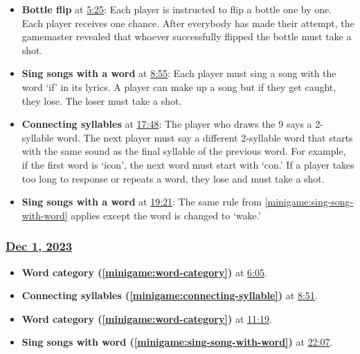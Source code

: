 \documentclass{article}
\begin{document}
\begin{itemize}
    \item \textbf{Bottle flip} at \href{https://youtu.be/S_QeMzgNCyg?t=325}{5:25}: Each player is instructed to flip a bottle one by one. Each player receives one chance. After everybody has made their attempt, the gamemaster revealed that whoever successfully flipped the bottle must take a shot. \label{minigame:bottle-flip}
    \item \textbf{Sing songs with a word} at \href {https://youtu.be/S_QeMzgNCyg?t=534}{8:55}: Each player must sing a song with the word `if' in its lyrics. A player can make up a song but if they get caught, they lose. The loser must take a shot.\label{minigame:sing-song-with-word}
    \item  \textbf{Connecting syllables} at \href{https://youtu.be/S_QeMzgNCyg?t=1068}{17:48}: The player who draws the 9 says a 2-syllable word. The next player must say a different 2-syllable word that starts with the same sound as the final syllable of the previous word. For example, if the first word is `icon', the next word must start with `con.' If a player takes too long to response or repeats a word, they lose and must take a shot.\label{minigame:connecting-syllable}
    \item \textbf{Sing songs with a word} at \href{https://youtu.be/S_QeMzgNCyg?t=1161}{19:21}: The same rule from \ref{minigame:sing-song-with-word} applies except the word is changed to `wake.'
\end{itemize}

\subsubsection{\href{https://youtu.be/S_QeMzgNCyg}{Dec 1, 2023}}

\begin{itemize}
    \item \textbf{Word category (\ref{minigame:word-category})} at \href{https://youtu.be/qGlxgQeKXUg?t=365}{6:05}.
    \item \textbf{Connecting syllables (\ref{minigame:connecting-syllable})} at \href{https://youtu.be/qGlxgQeKXUg?&t=530}{8:51}.
    \item \textbf{Word category (\ref{minigame:word-category})} at \href{https://youtu.be/qGlxgQeKXUg?t=677}{11:19}.
    \item \textbf{Sing songs with word (\ref{minigame:sing-song-with-word})} at \href{https://youtu.be/qGlxgQeKXUg?t=1327}{22:07}.
\end{itemize}
\end{document}
